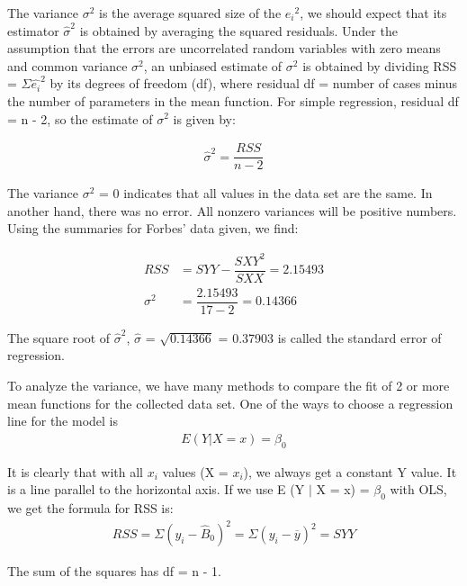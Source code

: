 \documentclass{article}
\begin{document}
    The variance ${\sigma}^2$ is the average squared size of the ${e_{i}}^2$, we should expect that its estimator $\hat{\sigma}^2$ is obtained by averaging the squared residuals. Under the assumption that the errors are uncorrelated random variables with zero means and common variance ${\sigma}^2$, an unbiased estimate of ${\sigma}^2$ is obtained by dividing RSS =  $\Sigma{{\hat{e_{i}}}^2}$ by its degrees of freedom (df), where residual df = number of cases minus the number of parameters in the mean function. For simple regression, residual df = n - 2, so the estimate of ${\sigma}^2$ is given by: 
    
    \begin{align} 
        \hat\sigma^2 = \dfrac{RSS}{n - 2}
    \end{align}
    
    The variance ${\sigma}^2$ = 0 indicates that all values in the data set are the same. In another hand,  there was no error. All nonzero variances will be positive numbers. Using the summaries for Forbes' data given, we find: 
    
    \begin{align} 
        RSS &= SYY - \dfrac{SXY^2}{SXX}     = 2.15493 \\
        \sigma^2 &= \dfrac{2.15493}{17 - 2} = 0.14366
    \end{align}
    
    The square root of $\hat{\sigma}^2$, $\hat{\sigma}$ = $\sqrt{0.14366}$ = 0.37903 is called the standard error of regression. 
    
    To analyze the variance, we have many methods to compare the fit of 2 or more mean functions for the collected data set. One of the ways to choose a regression line for the model is
    \begin{align} \label{eq1}
        E(Y | X = x) = \beta_{0} 
    \end{align}
	
    It is clearly that with all $x_{i}$ values (X = $x_{i}$), we always get a constant Y value. It is a line parallel to the horizontal axis. If we use E (Y $|$ X = x) = $\beta_{0}$ with OLS, we get the formula for RSS is:	
    \begin{align}
        RSS = \Sigma(y_{i} - \hat{B}_{0})^{2} = \Sigma(y_{i} - \overline{y})^{2} = SYY 
    \end{align}
    
    The sum of the squares has df = n - 1. 
    
\end{document}
